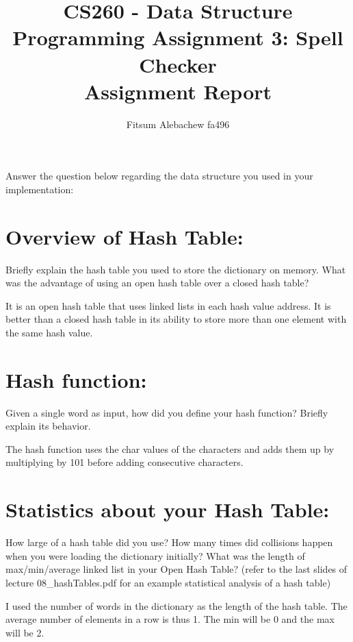 \documentclass[addpoints,11pt,answers]{exam}
\title{CS260 - Data Structure\\ Programming Assignment 3: Spell Checker \\ Assignment Report}
\author{Fitsum Alebachew fa496}
\date{}
\begin{document}
\maketitle

\begin{questions}
 Answer the question below regarding the data structure you used in your implementation:

    \begin{parts}
     \part[2] {\bf Overview of Hash Table:} Briefly explain the hash table you used to store the dictionary on memory. What was the advantage of using an open hash table over a closed hash table?
     \begin{solution}
       It is an open hash table that uses linked lists in each hash value address. It is better than a closed hash table in its ability to store more than one element with the same hash value.
     \end{solution}
     \part[2] {\bf Hash function:} Given a single word as input, how did you define your hash function? Briefly explain its behavior.
     \begin{solution}
       The hash function uses the char values of the characters and adds them up by multiplying by 101 before adding consecutive characters.
     \end{solution}
     \part[4] {\bf Statistics about your Hash Table:} How large of a hash table did you use? How many times did collisions happen when you were loading the dictionary initially? What was the length of max/min/average linked list in your Open Hash Table? (refer to the last slides of lecture 08\_hashTables.pdf for an example statistical analysis of a hash table)
     \begin{solution}
         I used the number of words in the dictionary as the length of the hash table. The average number of elements in a row is thus 1. The min will be 0 and the max will be 2.
     \end{solution}
    \end{parts}


\end{questions}
\end{document}
